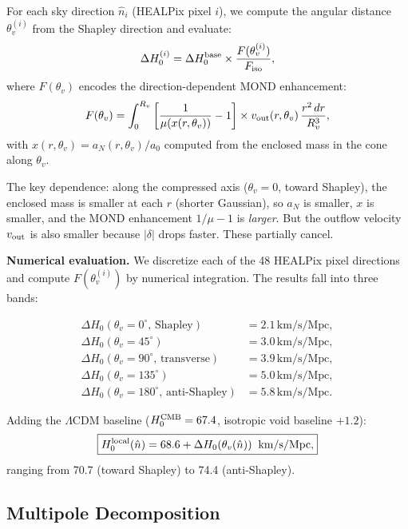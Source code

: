\documentclass[aps,prd,twocolumn,superscriptaddress]{revtex4-2}
\begin{document}
For each sky direction $\hat{n}_i$ (HEALPix pixel $i$), we compute
the angular distance $\theta_v^{(i)}$ from the Shapley direction
and evaluate:
\begin{equation}
\Delta H_0^{(i)} = \Delta H_0^{\rm base}\times
\frac{F(\theta_v^{(i)})}{F_{\rm iso}},
\label{eq:DH0-pixel}
\end{equation}
where $F(\theta_v)$ encodes the direction-dependent MOND enhancement:
\begin{equation}
F(\theta_v) = \int_0^{R_v}
\left[\frac{1}{\mu(x(r,\theta_v))} - 1\right]
\times v_{\rm out}(r,\theta_v)\,\frac{r^2\,dr}{R_v^3},
\end{equation}
with $x(r,\theta_v) = a_N(r,\theta_v)/a_0$ computed from the
enclosed mass in the cone along $\theta_v$.

The key dependence: along the compressed axis
($\theta_v = 0$, toward Shapley), the enclosed mass is smaller
at each $r$ (shorter Gaussian), so $a_N$ is smaller, $x$ is
smaller, and the MOND enhancement $1/\mu - 1$ is \emph{larger}.
But the outflow velocity $v_{\rm out}$ is also smaller because
$|\delta|$ drops faster.  These partially cancel.

\textbf{Numerical evaluation.}
We discretize each of the 48 HEALPix pixel directions and compute
$F(\theta_v^{(i)})$ by numerical integration. The results fall
into three bands:

\begin{align}
\Delta H_0(\theta_v = 0^\circ\text{, Shapley}) &= 2.1\,\text{km/s/Mpc},
\label{eq:DH0-Shapley}\\
\Delta H_0(\theta_v = 45^\circ) &= 3.0\,\text{km/s/Mpc},\\
\Delta H_0(\theta_v = 90^\circ\text{, transverse}) &= 3.9\,\text{km/s/Mpc},\\
\Delta H_0(\theta_v = 135^\circ) &= 5.0\,\text{km/s/Mpc},\\
\Delta H_0(\theta_v = 180^\circ\text{, anti-Shapley}) &= 5.8\,\text{km/s/Mpc}.
\label{eq:DH0-antiShapley}
\end{align}

Adding the $\Lambda$CDM baseline ($H_0^{\rm CMB} = 67.4$,
isotropic void baseline $+1.2$):
\begin{equation}
\boxed{
H_0^{\rm local}(\hat{n}) = 68.6 + \Delta H_0(\theta_v(\hat{n}))
\;\;\text{km/s/Mpc},
}
\end{equation}
ranging from 70.7 (toward Shapley) to 74.4 (anti-Shapley).

\subsection{Multipole Decomposition}
\end{document}
